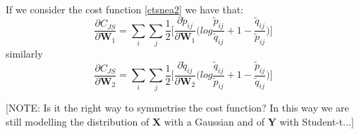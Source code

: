 \documentclass[11pt]{article}
\begin{document}
\\
If we consider the cost function \ref{ctsnea2} we have that:
\begin{equation}
\frac{\partial C_{JS}}{\partial \mathbf{W}_1}=\sum_i \sum_j \frac{1}{2}\Big[ \frac{\partial\tilde{p}_{ij}}{\partial \mathbf{W}_1} \Big( log \frac{\tilde{p}_{ij}}{\tilde{q}_{ij}} + 1 - \frac{\tilde{q}_{ij}}{\tilde{p}_{ij}}\Big) \Big]
\end{equation}
similarly
\begin{equation}
\frac{\partial C_{JS}}{\partial \mathbf{W}_2}=\sum_i \sum_j \frac{1}{2}\Big[ \frac{\partial\tilde{q}_{ij}}{\partial \mathbf{W}_2} \Big( log \frac{\tilde{q}_{ij}}{\tilde{p}_{ij}} + 1 - \frac{\tilde{p}_{ij}}{\tilde{q}_{ij}}\Big) \Big]\end{equation}

[NOTE: Is it the right way to symmetrise the cost function? In this way we are still modelling the distribution of $\mathbf{X}$ with a Gaussian and of $\mathbf{Y}$ with Student-t...]
\end{document}
